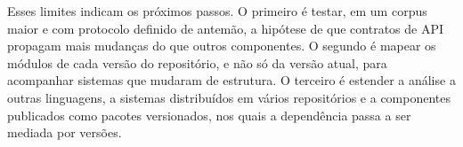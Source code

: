 Esses limites indicam os próximos passos. O primeiro é testar, em um corpus maior e com protocolo definido de antemão, a hipótese de que contratos de API propagam mais mudanças do que outros componentes. O segundo é mapear os módulos de cada versão do repositório, e não só da versão atual, para acompanhar sistemas que mudaram de estrutura. O terceiro é estender a análise a outras linguagens, a sistemas distribuídos em vários repositórios e a componentes publicados como pacotes versionados, nos quais a dependência passa a ser mediada por versões.
